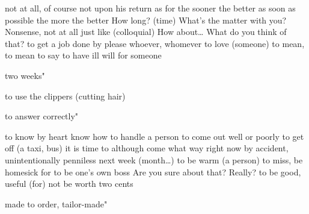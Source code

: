 {{{{{{{{{{{{{  
{not at all, of course not}
{upon his return}
{as for}
{the sooner the better}
{as soon as possible}
{the more the better}
{How long? (time)}
{What’s the matter with you?}
{Nonsense, not at all}
{just like (colloquial)}
{How about…}
{What do you think of that?}
{to get a job done by}
{please}
{whoever, whomever}
{to love (someone)}
{to mean, to mean to say}
{to have ill will for someone}
{two weeks"

{to use the clippers (cutting hair)}
{to answer correctly"

{to know by heart}
{know how to handle a person}
{to come out well or poorly}
{to get off (a taxi, bus)}
{it is time to}
{although}
{come what way}
{right now}
{by accident, unintentionally}
{penniless}
{next week (month…)}
{to be warm (a person)}
{to miss, be homesick for}
{to be one’s own boss}
{Are you sure about that?}
{Really?}
{to be good, useful (for)}
{not be worth two cents}
{made to order, tailor-made"

}}}}}}}}}}}}}}}}
